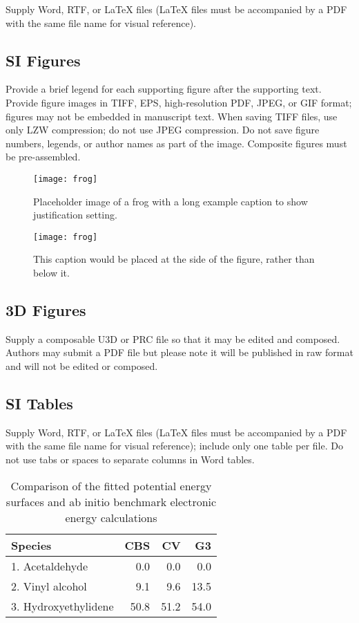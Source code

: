 \documentclass[9pt,twocolumn,twoside]{pnas-new}
\begin{document}
Supply Word, RTF, or LaTeX files (LaTeX files must be accompanied by a PDF with the same file name for visual reference).

\subsection*{SI Figures}

Provide a brief legend for each supporting figure after the supporting text. Provide figure images in TIFF, EPS, high-resolution PDF, JPEG, or GIF format; figures may not be embedded in manuscript text. When saving TIFF files, use only LZW compression; do not use JPEG compression. Do not save figure numbers, legends, or author names as part of the image. Composite figures must be pre-assembled.

\begin{figure}[tbhp!]
\centering
\texttt{[image: frog]}
\caption{Placeholder image of a frog with a long example caption to show justification setting.}
\label{fig:frog}
\end{figure}

\begin{SCfigure*}[\sidecaptionrelwidth][t]
\centering
\texttt{[image: frog]}
\caption{This caption would be placed at the side of the figure, rather than below it.}\label{fig:side}
\end{SCfigure*}


\subsection*{3D Figures}

Supply a composable U3D or PRC file so that it may be edited and composed. Authors may submit a PDF file but please note it will be published in raw format and will not be edited or composed.

\subsection*{SI Tables}

Supply Word, RTF, or LaTeX files (LaTeX files must be accompanied by a PDF with the same file name for visual reference); include only one table per file. Do not use tabs or spaces to separate columns in Word tables.

\begin{table}[tbhp!]
\centering
\caption{Comparison of the fitted potential energy surfaces and ab initio benchmark electronic energy calculations}
\begin{tabular}{lrrr}
Species & CBS & CV & G3 \\
\midrule
1. Acetaldehyde & 0.0 & 0.0 & 0.0 \\
2. Vinyl alcohol & 9.1 & 9.6 & 13.5 \\
3. Hydroxyethylidene & 50.8 & 51.2 & 54.0\\
\bottomrule
\end{tabular}

\end{table}
\end{document}
